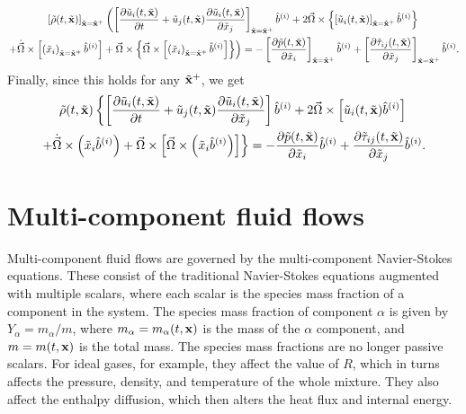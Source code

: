 \documentclass[oneside,a4paper,11pt]{report}
\begin{document}
\begin{multline}
    \left [ \tilde{\rho}(t,\tilde{\mathbf{x}}) \right]_{\tilde{\mathbf{x}} = \tilde{\mathbf{x}}^+} \left ( \left [ \frac{\partial \tilde{u}_i(t,\tilde{\mathbf{x}})}{\partial t} + \tilde{u}_j(t,\tilde{\mathbf{x}}) \frac{\partial \tilde{u}_i(t,\tilde{\mathbf{x}})}{\partial \tilde{x}_j} \right ]_{\tilde{\mathbf{x}} = \tilde{\mathbf{x}}^+} \hat{b}^{(i)} + 2 \vec{\Omega} \times \left \{ \left [\tilde{u}_i(t,\tilde{\mathbf{x}}) \right ]_{\tilde{\mathbf{x}} = \tilde{\mathbf{x}}^+} \hat{b}^{(i)} \right \} \right . \\
    \left . + \dot{\vec{\Omega}} \times \left [ \left ( \tilde{x}_i \right)_{\tilde{\mathbf{x}} = \tilde{\mathbf{x}}^+} \hat{b}^{(i)}\right ] + \vec{\Omega} \times \left \{ \vec{\Omega} \times \left [ \left ( \tilde{x}_i \right )_{\tilde{\mathbf{x}} = \tilde{\mathbf{x}}^+} \hat{b}^{(i)}\right ] \right \} \right ) = -\left [ \frac{\partial \tilde{p}(t,\tilde{\mathbf{x}})}{\partial \tilde{x}_i} \right]_{\tilde{\mathbf{x}} = \tilde{\mathbf{x}}^+} \hat{b}^{(i)} + \left [ \frac{\partial \tilde{\tau}_{ij}(t,\tilde{\mathbf{x}})}{\partial \tilde{x}_j} \right ]_{\tilde{\mathbf{x}} = \tilde{\mathbf{x}}^+} \hat{b}^{(i)}.
\end{multline}
Finally, since this holds for any $\tilde{\mathbf{x}}^+$, we get
\begin{multline}
    \tilde{\rho}(t,\tilde{\mathbf{x}}) \left \{ \left [ \frac{\partial \tilde{u}_i(t,\tilde{\mathbf{x}})}{\partial t} + \tilde{u}_j(t,\tilde{\mathbf{x}}) \frac{\partial \tilde{u}_i(t,\tilde{\mathbf{x}})}{\partial \tilde{x}_j} \right ] \hat{b}^{(i)} + 2 \vec{\Omega} \times \left [ \tilde{u}_i(t,\tilde{\mathbf{x}}) \hat{b}^{(i)} \right ] \right . \\
    \left . + \dot{\vec{\Omega}} \times \left ( \tilde{x}_i \hat{b}^{(i)}\right ) + \vec{\Omega} \times \left [ \vec{\Omega} \times \left ( \tilde{x}_i \hat{b}^{(i)} \right ) \right ] \right \} = -\frac{\partial \tilde{p}(t,\tilde{\mathbf{x}})}{\partial \tilde{x}_i} \hat{b}^{(i)} + \frac{\partial \tilde{\tau}_{ij}(t,\tilde{\mathbf{x}})}{\partial \tilde{x}_j} \hat{b}^{(i)}.
\end{multline}

%
\chapter{Multi-component fluid flows}
%
Multi-component fluid flows are governed by the multi-component Navier-Stokes equations. These consist of the traditional Navier-Stokes equations augmented with multiple scalars, where each scalar is the species mass fraction of a component in the system. The species mass fraction of component $\alpha$ is given by $Y_\alpha = m_\alpha/m$, where $m_\alpha = m_\alpha(t,\mathbf{x})$ is the mass of the $\alpha$ component, and $m = m(t,\mathbf{x})$ is the total mass. The species mass fractions are no longer passive scalars. For ideal gases, for example, they affect the value of $R$, which in turns affects the pressure, density, and temperature of the whole mixture. They also affect the enthalpy diffusion, which then alters the heat flux and internal energy. 
\end{document}
